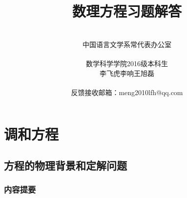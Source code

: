 \documentclass[12pt, a4paper]{ctexbook}
\title{\heiti{} 数理方程习题解答}
\author{\\中国语言文学系常代表办公室\\ \\
    数学科学学院2016级本科生\\
    李飞虎\quad 李响\quad 王旭磊\\ \\
    反馈接收邮箱：meng2010lfh@qq.com}
\begin{document}
    

    
    \thispagestyle{empty}
    \maketitle
    
    \newpage
    \setcounter{page}{1}
    
    \tableofcontents
    
    
    \newpage
    
    \setcounter{page}{1}

    
    \chapter{调和方程}
    \section{方程的物理背景和定解问题}
    \subsection{内容提要}
    
\end{document}
